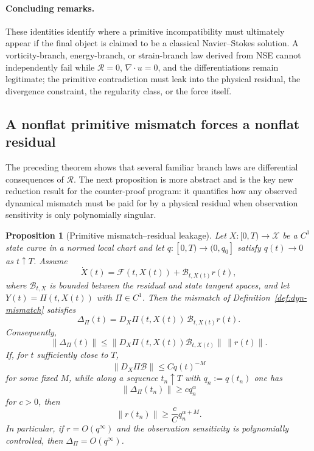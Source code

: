 \documentclass[12pt]{article}
\newtheorem{proposition}[theorem]{Proposition}
\newcommand{\X}{\mathcal X}
\newcommand{\Rres}{\mathcal R}
\begin{document}
\paragraph{Concluding remarks.}
These identities identify where a primitive incompatibility must ultimately appear if the final object is claimed to be a classical Navier--Stokes solution. A vorticity-branch, energy-branch, or strain-branch law derived from NSE cannot independently fail while $\Rres=0$, $\nabla\cdot u=0$, and the differentiations remain legitimate; the primitive contradiction must leak into the physical residual, the divergence constraint, the regularity class, or the force itself.


\subsection{A nonflat primitive mismatch forces a nonflat residual}
The preceding theorem shows that several familiar branch laws are differential consequences of $\Rres$. The next proposition is more abstract and is the key new reduction result for the counter-proof program: it quantifies how any observed dynamical mismatch must be paid for by a physical residual when observation sensitivity is only polynomially singular.

\begin{proposition}[Primitive mismatch--residual leakage]\label{prop:residualleakage}
Let $X:[0,T)\to\X$ be a $C^1$ state curve in a normed local chart and let $q:[0,T)\to(0,q_0]$ satisfy $q(t)\to0$ as $t\uparrow T$. Assume
\[
\dot X(t)=\mathcal F(t,X(t))+\mathcal B_{t,X(t)}r(t),
\]
where $\mathcal B_{t,X}$ is bounded between the residual and state tangent spaces, and let $Y(t)=\Pi(t,X(t))$ with $\Pi\in C^1$. Then the mismatch of Definition~\ref{def:dyn-mismatch} satisfies
\[
\boxed{
\Delta_\Pi(t)=D_X\Pi(t,X(t))\,\mathcal B_{t,X(t)}r(t).
}
\]
Consequently,
\[
\|\Delta_\Pi(t)\|
\le
\|D_X\Pi(t,X(t))\mathcal B_{t,X(t)}\|\,\|r(t)\|.
\]
If, for $t$ sufficiently close to $T$,
\[
\|D_X\Pi\mathcal B\|\le Cq(t)^{-M}
\]
for some fixed $M$, while along a sequence $t_n\uparrow T$ with $q_n:=q(t_n)$ one has
\[
\|\Delta_\Pi(t_n)\|\ge c q_n^{\alpha}
\]
for $c>0$, then
\[
\boxed{
\|r(t_n)\|\ge \frac{c}{C}q_n^{\alpha+M}.
}
\]
In particular, if $r=O(q^\infty)$ and the observation sensitivity is polynomially controlled, then $\Delta_\Pi=O(q^\infty)$.
\end{proposition}
\end{document}
